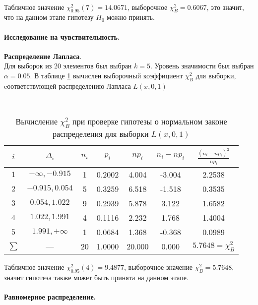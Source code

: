\documentclass[12pt]{article}
\begin{document}
\phantom{0}\\
Табличное значение $\chi^2_{0.95}(7) = 14.0671$, выборочное $\chi^2_B = 0.6067$, это значит, что на данном этапе гипотезу $H_0$ можно принять.\\
\phantom{0}\\
\textbf{Исследование на чувствительность.}\\
\phantom{0}\\
\textbf{Распределение Лапласа}.\\
Для выборок из 20 элементов был выбран $k=5$. Уровень значимости был выбран $\alpha = 0.05$. В таблице \ref{chiLap} вычислен выборочный коэффициент $\chi^2_B$ для выборки, cоответствующей распределению Лапласа $L(x,0,1)$
\newpage  
\begin{table}[h!]
    \begin{center}
        \caption{Вычисление $\chi^2_B$ при проверке гипотезы о нормальном законе распределения для выборки $L(x,0,1)$}
        \phantom{0}\\
        \begin{tabular}{|c|c|c|c|c|c|c|}\hline
            $i$ & $\Delta_i$ & $n_i$ & $p_i$ & $np_i$ & $n_i - np_i$ & $\frac{(n_i-np_i)^2}{np_i}$\\
            \hline
            $1$ & $-\infty, -0.915$ & 1 & 0.2002 & 4.004 & -3.004 & 2.2538\\
            \hline
            $2$ & $-0.915, 0.054$ & 5 & 0.3259 & 6.518 & -1.518 & 0.3535\\
            \hline
            $3$ & $0.054, 1.022$ & 9 & 0.2939 & 5.878 & 3.122 & 1.6582\\
            \hline
            $4$ & $1.022, 1.991$ & 4 & 0.1116 & 2.232 & 1.768 & 1.4004\\
            \hline
            $5$ & $1.991, +\infty$ & 1 & 0.0684 & 1.368 & -0.368 & 0.0989\\
            \hline
            $\sum$ & --- & 20 & 1.0000 & 20.000 & 0.000 & $5.7648 = \chi^2_B$\\
            \hline
        \end{tabular}
    \label{chiLap}
    \end{center}
\end{table}
Табличное значение $\chi^2_{0.95}(4) = 9.4877$, выборочное значение $\chi^2_B = 5.7648$, значит гипотеза также может быть принята на данном этапе.\\
\phantom{0}\\
\textbf{Равномерное распределение.}\\
\end{document}
